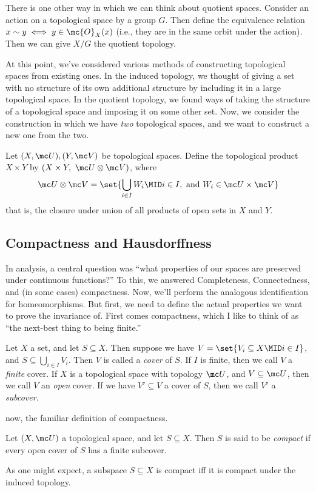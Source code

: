 \documentclass{fkbook}
\begin{document}
\begin{adjustwidth}{1em}{1em}
  There is one other way in which we can think about quotient spaces.
  Consider an action on a topological space by a group $G$. Then
  define the equivalence relation $x \sim y \iff y \in \mc{O}_{X}(x)$
  (i.e., they are in the same orbit under the action). Then we can
  give $X/G$ the quotient topology.

  At this point, we've considered various methods of constructing
  topological spaces from existing ones. In the induced topology, we
  thought of giving a set with no structure of its own additional
  structure by including it in a large topological space. In the
  quotient topology, we found ways of taking the structure of a
  topological space and imposing it on some other set. Now, we
  consider the construction in which we have \emph{two} topological
  spaces, and we want to construct a new one from the two.

  \begin{definition}
    Let $(X, \mc U), (Y, \mc V)$ be topological spaces. Define the
    topological product $X \times Y$ by $(X \times Y,\ \mc U \otimes
    \mc V)$, where
    \[
      \mc U \otimes \mc V = \set{\bigcup_{i \in I} W_i \MID i \in I,\
        \text{and}\ W_i \in \mc U \times \mc V}
    \]
    that is, the closure under union of all products of open sets in
    $X$ and $Y$.
  \end{definition}

  \subsection{Compactness and Hausdorffness}
  In analysis, a central question was ``what properties of our spaces
  are preserved under continuous functions?'' To this, we answered
  Completeness, Connectedness, and (in some cases) compactness. Now,
  we'll perform the analogous identification for homeomorphisms. But
  first, we need to define the actual properties we want to prove the
  invariance of. First comes compactness, which I like to think of as
  ``the next-best thing to being finite.''
  \begin{definition}[Covers]
    Let $X$ a set, and let $S \subseteq X$. Then suppose we have $V =
    \set{V_i \subseteq X \MID i \in I}$, and $S \subseteq
    \bigcup_{i\in I} V_i$. Then $V$ is called a \emph{cover} of $S$.
    If $I$ is finite, then we call $V$ a \emph{finite} cover. If $X$
    is a topological space with topology $\mc U$, and $V \subseteq \mc
    U$, then we call $V$ an \emph{open} cover. If we have $V'
    \subseteq V$ a cover of $S$, then we call $V'$ a \emph{subcover}.
  \end{definition}
  now, the familiar definition of compactness. \clearpage
  \begin{definition}
    Let $(X, \mc U)$ a topological space, and let $S \subseteq X$.
    Then $S$ is said to be \emph{compact} if every open cover of $S$
    has a finite subcover.
  \end{definition}
  As one might expect, a subspace $S \subseteq X$ is compact iff it is
  compact under the induced topology.

\end{adjustwidth}
\end{document}
